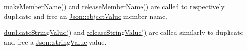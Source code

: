 \begin{DoxyItemize}
\item \hyperlink{classJson_1_1ValueAllocator_af2370043912c62bb2f3d3277b2c0a125}{make\-Member\-Name()} and \hyperlink{classJson_1_1ValueAllocator_ae8206cbaf1004994696a1ffec0d7e29a}{release\-Member\-Name()} are called to respectively duplicate and free an \hyperlink{namespaceJson_a7d654b75c16a57007925868e38212b4ea6ca35c0a30ea3d1b8ec95c2d1e41a1a8}{Json\-::object\-Value} member name.
\item \hyperlink{classJson_1_1ValueAllocator_aaa63197291f55d060541a01fcf5a5dfc}{duplicate\-String\-Value()} and \hyperlink{classJson_1_1ValueAllocator_aa75c50f08bab7db386673ab355668c99}{release\-String\-Value()} are called similarly to duplicate and free a \hyperlink{namespaceJson_a7d654b75c16a57007925868e38212b4ea8376d6395b33f22c7ec18b3fa016bb1c}{Json\-::string\-Value} value. 
\end{DoxyItemize}

